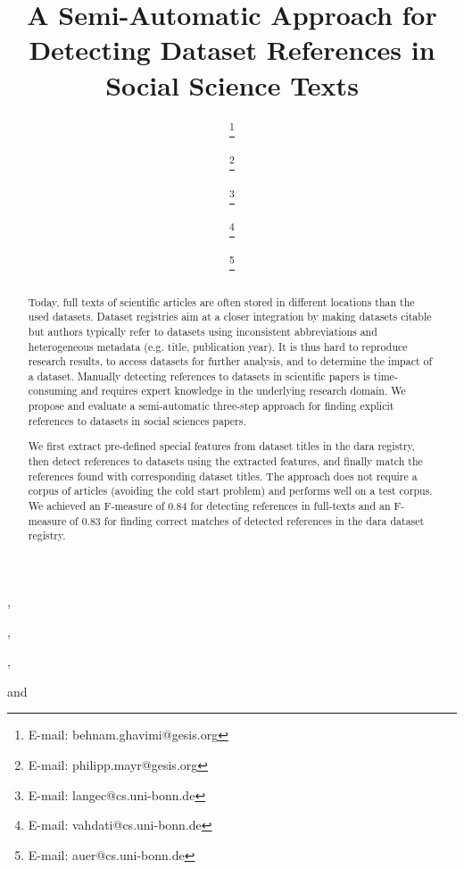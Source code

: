 \documentclass{IOS-Book-Article}
\newcommand{\dara}{\textsf{da\textbar ra}}
\begin{document}
\pagestyle{headings}
\def\thepage{}

\begin{frontmatter}
\title{A Semi-Automatic Approach for Detecting Dataset References in Social Science Texts} %

\author[A,B]{ 
\thanks{E-mail: behnam.ghavimi@gesis.org}},
\author[A]{ 
\thanks{E-mail: philipp.mayr@gesis.org}},
\author[B,C]{  
\thanks{E-mail: langec@cs.uni-bonn.de}},
\author[B]{ 
\thanks{E-mail: vahdati@cs.uni-bonn.de}}
and
\author[B,C]{  
\thanks{E-mail: auer@cs.uni-bonn.de}}

\address[A]{GESIS – Leibniz Institute for the Social Sciences}
\address[B]{Enterprise Information Systems (EIS), University of Bonn}
\address[C]{Fraunhofer Institute for Intelligent Analysis and Information Systems IAIS}
\begin{abstract}
Today, full texts of scientific articles are often stored in different locations than the used datasets.
Dataset registries aim at a closer integration by making datasets citable 
but authors typically refer to datasets using inconsistent abbreviations and heterogeneous metadata (e.g. title, publication year).
It is thus hard to reproduce research results, to access datasets for further analysis, and to determine the impact of a dataset.
Manually detecting references to datasets in scientific papers is time-consuming and requires expert knowledge in the underlying research domain. 
We propose and evaluate a semi-automatic three-step approach for finding explicit references to datasets in social sciences papers.

We first extract pre-defined special features from dataset titles in the {\dara} registry, then detect references to datasets using the extracted features, and finally match the references found with corresponding dataset titles.
The approach does not require a corpus of articles (avoiding the cold start problem) and performs well on a test corpus. 
We achieved an F-measure of 0.84 for detecting references in full-texts and an F-measure of 0.83 for finding correct matches of detected references in the {\dara} dataset registry.


\end{abstract}
\end{frontmatter}
\end{document}
